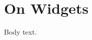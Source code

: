 \documentclass{article}
\begin{document}
\def\title{On Widgets}
\section*{\title}
Body text.
\end{document}
